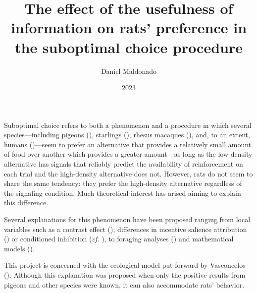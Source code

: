 \documentclass[a4paper,12pt]{article}
\title{The effect of the usefulness of information on rats' preference in the suboptimal choice procedure}
\author{Daniel Maldonado}
\date{2023}
\begin{document}
{\bfseries \maketitle}

Suboptimal choice refers to both a phenomenon and a procedure in which several species---including pigeons (\cite{Gipson2009}), starlings (\cite{Vasconcelos2015}), rhesus macaques (\cite{Smith2017}), and, to an extent, humans (\cite{Molet2012})---seem to prefer an alternative that provides a relatively small amount of food over another which provides a greater amount---as long as the low-density alternative has signals that reliably predict the availability of reinforcement on each trial and the high-density alternative does not.
However, rats do not seem to share the same tendency: they prefer the high-density alternative regardless of the signaling condition. Much theoretical interest has arised aiming to explain this difference.


Several explanations for this phenomenon have been proposed ranging from local variables such as a contrast effect (\cite{Zentall2016}), differences in incentive salience attribution (\cite{Chow2017}) or conditioned inhibition ({\itshape cf.} \cite{Laude2014a,Trujano2016}), to foraging analyses (\cite{Vasconcelos2015}) and mathematical models (\cite{Cunningham2018,Daniels2018}).

This project is concerned with the ecological model put forward by Vasconcelos (\citeyear{Vasconcelos2015}). Although this explanation was proposed when only the positive results from pigeons and other species were known, it can also accommodate rats' behavior.
\end{document}
